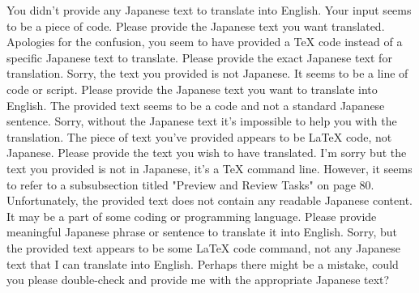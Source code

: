 You didn't provide any Japanese text to translate into English. Your input seems to be a piece of code. Please provide the Japanese text you want translated.
Apologies for the confusion, you seem to have provided a TeX code instead of a specific Japanese text to translate. Please provide the exact Japanese text for translation.
Sorry, the text you provided is not Japanese. It seems to be a line of code or script.
Please provide the Japanese text you want to translate into English. The provided text seems to be a code and not a standard Japanese sentence.
Sorry, without the Japanese text it's impossible to help you with the translation. The piece of text you've provided appears to be LaTeX code, not Japanese. Please provide the text you wish to have translated.
I'm sorry but the text you provided is not in Japanese, it's a TeX command line. However, it seems to refer to a subsubsection titled "Preview and Review Tasks" on page 80.
Unfortunately, the provided text does not contain any readable Japanese content. It may be a part of some coding or programming language. Please provide meaningful Japanese phrase or sentence to translate it into English.
Sorry, but the provided text appears to be some LaTeX code command, not any Japanese text that I can translate into English. Perhaps there might be a mistake, could you please double-check and provide me with the appropriate Japanese text?
